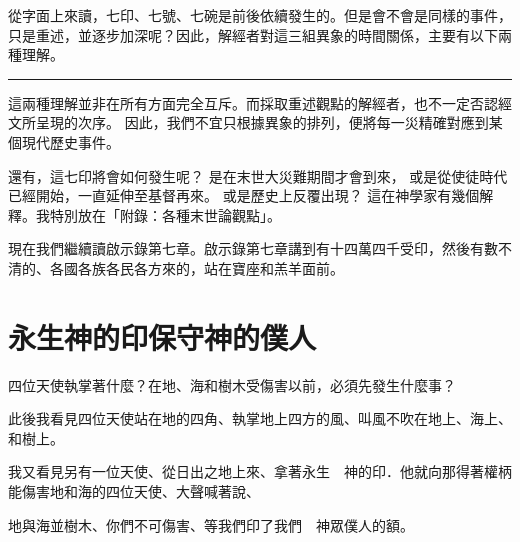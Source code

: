 \begin{InDepth}

從字面上來讀，七印、七號、七碗是前後依續發生的。但是會不會是同樣的事件，只是重述，並逐步加深呢？因此，解經者對這三組異象的時間關係，主要有以下兩種理解。

\par\medskip
{\small\renewcommand{\arraystretch}{1}\setlength{\tabcolsep}{4pt}%
\noindent\begin{minipage}{\linewidth}
\centering
{}
\label{tab:seals-trumpets-bowls-zh}
\noindent\rule{\linewidth}{0.4pt}%
\end{minipage}
}
\par\medskip

這兩種理解並非在所有方面完全互斥。而採取重述觀點的解經者，也不一定否認經文所呈現的次序。
因此，我們不宜只根據異象的排列，便將每一災精確對應到某個現代歷史事件。
\end{InDepth}

還有，這七印將會如何發生呢？
是在末世大災難期間才會到來，
或是從使徒時代已經開始，一直延伸至基督再來。
或是歷史上反覆出現？
這在神學家有幾個解釋。我特別放在「附錄：各種末世論觀點」。


現在我們繼續讀啟示錄第七章。啟示錄第七章講到有十四萬四千受印，然後有數不清的、各國各族各民各方來的，站在寶座和羔羊面前。

\section{永生神的印保守神的僕人}

\begin{ScriptureBox2}{四位天使執掌著什麼？在地、海和樹木受傷害以前，必須先發生什麼事？}
\item[7:1] 此後我看見四位天使站在地的四角、執掌地上四方的風、叫風不吹在地上、海上、和樹上。

\item[7:2] 我又看見另有一位天使、從日出之地上來、拿著永生　神的印．他就向那得著權柄能傷害地和海的四位天使、大聲喊著說、

\item[7:3] 地與海並樹木、你們不可傷害、等我們印了我們　神眾僕人的額。
\end{ScriptureBox2}

